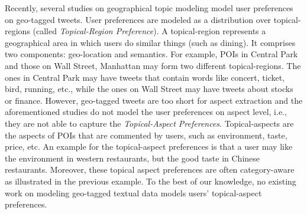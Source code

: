 Recently, several studies on geographical topic modeling
\cite{Hong:2012,YuanW4:2013} model
user preferences on geo-tagged tweets.
User preferences are modeled as a distribution over topical-regions (called
\emph{Topical-Region Preference}).
A topical-region represents a geographical area in which
users do similar things (such as dining).
It comprises two components: geo-location and semantics.
For example, POIs in Central Park and those on Wall Street, Manhattan
may form two different topical-regions. The ones in Central Park may have tweets
that contain words like concert, ticket, bird, running, etc., while the ones
on Wall Street may have tweets about stocks or finance.
However, geo-tagged tweets are too short for aspect extraction
and the aforementioned
studies do not model the user preferences on aspect
level, i.e., they are not able to capture the \emph{Topical-Aspect Preferences}.
Topical-aspects are the aspects of POIs that
are commented by users, such as environment, taste,
price, etc.
An example for the topical-aspect preferences is that
a user may like the environment in western restaurants, but
the good taste in Chinese restaurants.
Moreover, these topical aspect preferences
are often category-aware as illustrated in the previous example.
To the best of our knowledge, no existing
work on modeling geo-tagged textual data models users'
topical-aspect preferences.




